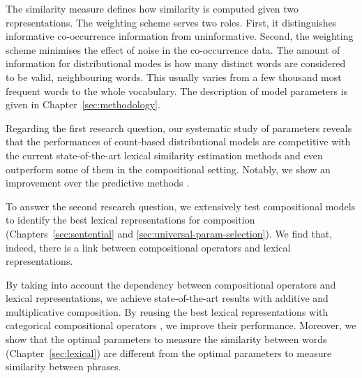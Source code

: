 
The similarity measure defines how similarity is computed given two representations. The weighting scheme serves two roles. First, it distinguishes informative co-occurrence information from uninformative. Second, the weighting scheme minimises the effect of noise in the co-occurrence data. The amount of information for distributional modes is how many distinct words are considered to be valid, neighbouring words. This usually varies from a few thousand most frequent words to the whole vocabulary.  The description of model parameters is given in Chapter~\ref{sec:methodology}.

Regarding the first research question, our systematic study of parameters reveals that the performances of count-based distributional models are competitive with the current state-of-the-art lexical similarity estimation methods and even outperform some of them in the compositional setting. Notably, we show an improvement over the predictive methods \cite{mikolov2013linguistic,mikolov2013distributed,mikolov2013efficient}.

To answer the second research question, we extensively test compositional models to identify the best lexical representations for composition (Chapters~\ref{sec:sentential} and \ref{sec:universal-param-selection}). We find that, indeed, there is a link between compositional operators and lexical representations.

By taking into account the dependency between compositional operators and lexical representations,  we achieve state-of-the-art results with additive and multiplicative composition. By reusing the best lexical representations with categorical compositional operators \cite{DBLP:journals/corr/abs-1003-4394}, we improve their performance. Moreover, we show that the optimal parameters to measure the similarity between words (Chapter~\ref{sec:lexical}) are different from the optimal parameters to measure similarity between phrases.


